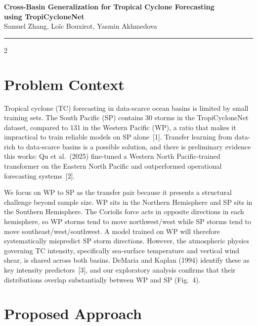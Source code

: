 \documentclass[9pt,a4paper]{article}
\begin{document}
\begin{center}
  {\large\bfseries Cross-Basin Generalization for Tropical Cyclone Forecasting\\using TropiCycloneNet}\\[3pt]
  {\small Samuel Zhang, Loïc Bouxirot, Yasmin Akhmedova}
\end{center}

\vspace{-2pt}
\hrule
\vspace{2pt}

\begin{multicols}{2}
  
  \section*{Problem Context}
  
  Tropical cyclone (TC) forecasting in data-scarce ocean basins is limited by small
  training sets. The South Pacific (SP) contains 30 storms in the TropiCycloneNet
  dataset, compared to 131 in the Western Pacific (WP), a ratio that makes it
  impractical to train reliable models on SP alone~[1]. Transfer learning from
  data-rich to data-scarce basins is a possible solution, and there is preliminary
  evidence this works: Qu et al.\ (2025) fine-tuned a Western North Pacific-trained
  transformer on the Eastern North Pacific and outperformed operational forecasting
  systems~[2].
  
  We focus on WP to SP as the transfer pair because it presents a structural
  challenge beyond sample size. WP sits in the Northern Hemisphere and SP sits in
  the Southern Hemisphere. The Coriolis force acts in opposite directions in each
  hemisphere, so WP storms tend to move northwest/west while SP storms tend to move
  southeast/west/southwest. A model trained on WP will therefore systematically
  mispredict SP storm directions. However, the atmospheric physics governing TC
  intensity, specifically sea-surface temperature and vertical wind shear, is shared
  across both basins. DeMaria and Kaplan (1994) identify these as key intensity
  predictors~[3], and our exploratory analysis confirms that their distributions
  overlap substantially between WP and SP (Fig.~4).
  \section*{Proposed Approach}
  

\end{multicols}
\end{document}

